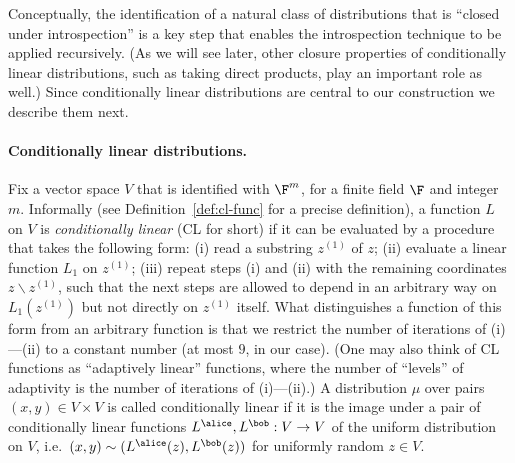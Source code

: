 	Conceptually,  the identification of a natural class of distributions that is ``closed under introspection'' is a key step that enables the introspection technique to be applied recursively. (As we will see later, other closure properties of conditionally linear distributions, such as taking direct products, play an important role as well.) Since conditionally linear distributions are central to our construction we describe them next. 
	


\paragraph{Conditionally linear distributions.} 
Fix a vector space $V$ that is identified with $\F^m$, for a finite field $\F$ and integer $m$. Informally (see Definition~\ref{def:cl-func} for a precise definition), a function $L$ on $V$ is \emph{conditionally linear} (CL for short) if it can be evaluated by a procedure that takes the following form: (i) read a substring $z^{(1)}$ of $z$; (ii) evaluate a linear function $L_1$ on $z^{(1)}$; (iii) repeat steps (i) and (ii) with the remaining coordinates $z\backslash z^{(1)}$, such that the next steps are allowed to depend in an arbitrary way on $L_1(z^{(1)})$ but not directly on $z^{(1)}$ itself. What distinguishes a function of this form from an arbitrary function is that we restrict the number of iterations of (i)---(ii) to a constant number (at most $9$, in our case). (One may also think of CL functions as ``adaptively linear'' functions, where the number of ``levels'' of adaptivity is the number of iterations of (i)---(ii).) A distribution $\mu$ over pairs $(x,y) \in V\times V$ is called {conditionally linear}  if it is the image under a pair of {conditionally linear functions} $L^\alice,L^\bob: V\to V$ of the uniform distribution on $V$, i.e.\ $(x,y)\sim (L^\alice(z),L^\bob(z))$ for uniformly random $z\in V$. 

